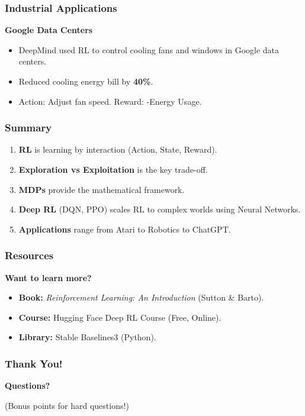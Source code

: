 \documentclass[aspectratio=169]{beamer}
\begin{document}
\begin{frame}
    \frametitle{Industrial Applications}
    \textbf{Google Data Centers}
    \begin{itemize}
        \item DeepMind used RL to control cooling fans and windows in Google data centers.
        \item Reduced cooling energy bill by \textbf{40\%}.
        \item Action: Adjust fan speed. Reward: -Energy Usage.
    \end{itemize}
\end{frame}

\begin{frame}
    \frametitle{Summary}
    \begin{enumerate}
        \item \textbf{RL} is learning by interaction (Action, State, Reward).
        \item \textbf{Exploration vs Exploitation} is the key trade-off.
        \item \textbf{MDPs} provide the mathematical framework.
        \item \textbf{Deep RL} (DQN, PPO) scales RL to complex worlds using Neural Networks.
        \item \textbf{Applications} range from Atari to Robotics to ChatGPT.
    \end{enumerate}
\end{frame}

\begin{frame}
    \frametitle{Resources}
    \textbf{Want to learn more?}
    \begin{itemize}
        \item \textbf{Book:} \textit{Reinforcement Learning: An Introduction} (Sutton \& Barto).
        \item \textbf{Course:} Hugging Face Deep RL Course (Free, Online).
        \item \textbf{Library:} Stable Baselines3 (Python).
    \end{itemize}
\end{frame}

\begin{frame}
    \frametitle{Thank You!}
    \begin{center}
        \Huge \textbf{Questions?}
        \vspace{1cm}

        \large
        (Bonus points for hard questions!)
    \end{center}
\end{frame}
\end{document}

